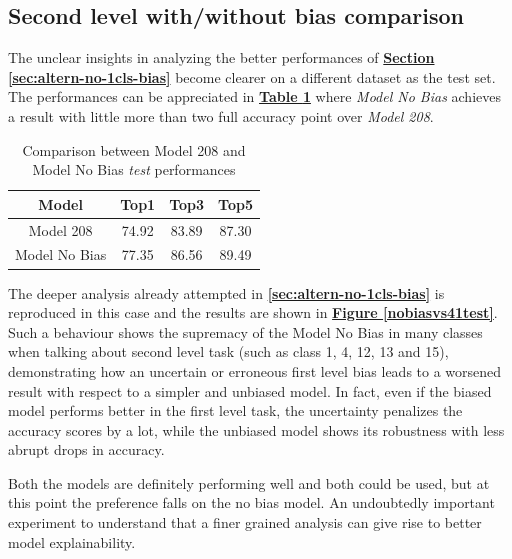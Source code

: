 \documentclass[12pt]{article}
\begin{document}
\pagebreak

\subsection{Second level with/without bias comparison}
The unclear insights in analyzing the better performances of \hyperref[sec:altern-no-1cls-bias]{\textbf{Section \ref{sec:altern-no-1cls-bias}}} become clearer on a different dataset as the test set. The performances can be appreciated in \hyperref[tb:test-bias-nobias]{\textbf{Table \ref{tb:test-bias-nobias}}} where \textit{Model No Bias} achieves a result with little more than two full accuracy point over \textit{Model 208}. 
\begin{table}[ht!]
    \begin{adjustwidth}{}{}
	    \centering
	    \small
	    \begin{tabular}{ |c|c|c|c| }
        \hline
        \textbf{Model} & \textbf{Top1} & \textbf{Top3} & \textbf{Top5}\\
        \hline
        Model 208 & 74.92 & 83.89 & 87.30\\
        Model No Bias & 77.35 & 86.56 & 89.49\\
        \hline
        \end{tabular}
    \end{adjustwidth}
    \captionsetup{justification   = centering}
    \caption{Comparison between Model 208 and Model No Bias \textit{test} performances}
    \label{tb:test-bias-nobias}
\end{table}

The deeper analysis already attempted in \textbf{\ref{sec:altern-no-1cls-bias}} is reproduced in this case and the results are shown in \hyperref[nobiasvs41test]{\textbf{Figure \ref{nobiasvs41test}}}.
Such a behaviour shows the supremacy of the Model No Bias in many classes when talking about second level task (such as class 1, 4, 12, 13 and 15), demonstrating how an uncertain or erroneous first level bias leads to a worsened result with respect to a simpler and unbiased model. 
In fact, even if the biased model performs better in the first level task, the uncertainty penalizes the accuracy scores by a lot, while the unbiased model shows its robustness with less abrupt drops in accuracy.

Both the models are definitely performing well and both could be used, but at this point the preference falls on the no bias model. An undoubtedly important experiment to understand that a finer grained analysis can give rise to better model explainability.
\end{document}
